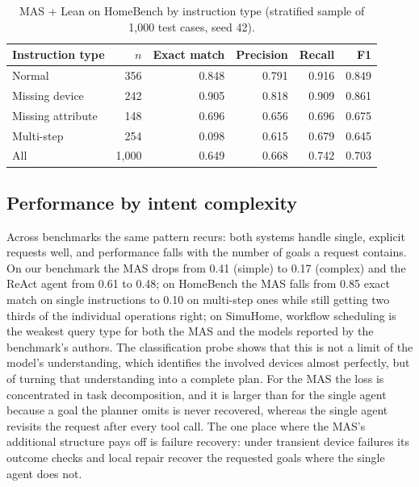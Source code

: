 \documentclass[a4paper,11pt]{article}
\begin{document}
\begin{table}[htbp]
  \centering
  \small
  \caption{MAS + Lean on HomeBench by instruction type (stratified sample of 1,000 test cases, seed 42).}
  \label{tab:gemma4-homebench}
  \begin{tabular}{lrrrrr}
    \toprule
    Instruction type   & $n$   & Exact match & Precision & Recall & F1    \\
    \midrule
    Normal             & 356   & 0.848 & 0.791 & 0.916 & 0.849 \\
    Missing device     & 242   & 0.905 & 0.818 & 0.909 & 0.861 \\
    Missing attribute  & 148   & 0.696 & 0.656 & 0.696 & 0.675 \\
    Multi-step         & 254   & 0.098 & 0.615 & 0.679 & 0.645 \\
    \midrule
    All                & 1,000 & 0.649 & 0.668 & 0.742 & 0.703 \\
    \bottomrule
  \end{tabular}
\end{table}

\subsection{Performance by intent complexity}
\label{sec:eval-complexity}

Across benchmarks the same pattern recurs: both systems handle single, explicit requests well, and
performance falls with the number of goals a request contains. On our benchmark the MAS drops from
0.41 (simple) to 0.17 (complex) and the ReAct agent from 0.61 to 0.48; on HomeBench the MAS
falls from 0.85 exact match on single instructions to 0.10 on multi-step ones while still getting
two thirds of the individual operations right; on SimuHome, workflow scheduling is the weakest
query type for both the MAS and the models reported by the benchmark's authors. The classification
probe shows that this is not a limit of the model's understanding, which identifies the involved
devices almost perfectly, but of turning that understanding into a complete plan. For the MAS the
loss is concentrated in task decomposition, and it is larger than for the single agent because a
goal the planner omits is never recovered, whereas the single agent revisits the request after
every tool call. The one place where the MAS's additional structure pays off is failure recovery:
under transient device failures its outcome checks and local repair recover the requested goals
where the single agent does not.
\end{document}
